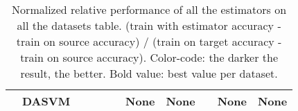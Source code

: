 \begin{table}[H]
\begin{tabular}{c|l|c|c|c|c|c|c|c|c|c|}
 & DASVM & \cellcolor{green!90}{+0.57} & \cellcolor{green!55}{+0.44} & \cellcolor{red!18}{-0.2} & \cellcolor{red!90}{-0.06} & None & None & \textbf{\cellcolor{green!90}{+0.63}} & None & None \\
\hline
\end{tabular}
\caption{Normalized relative performance of all the estimators on all the datasets table. (train with estimator accuracy - train on source accuracy) / (train on target accuracy - train on source accuracy). Color-code: the darker the result, the better. Bold value: best value per dataset.}
\end{table}